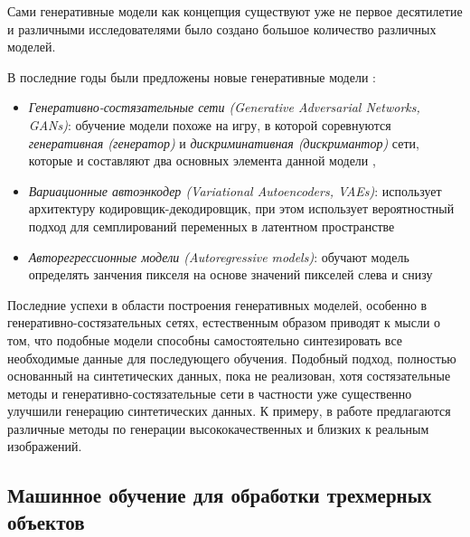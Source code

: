 Сами генеративные модели как концепция существуют уже не первое десятилетие и различными исследователями было создано большое количество различных моделей.

В последние годы были предложены новые генеративные модели \cite{sanchez-at-glance}:

\begin{itemize}

\item \textit{Генеративно-состязательные сети (Generative Adversarial Networks, GANs)}: обучение модели похоже на игру, в которой соревнуются \textit{генеративная (генератор)} и \textit{дискриминативная (дискримантор)} сети, которые и составляют два основных элемента данной модели \cite{gan-1}, \cite{gan-super}

\item \textit{Вариационные автоэнкодер (Variational Autoencoders, VAEs)}: использует архитектуру кодировщик-декодировщик, при этом использует вероятностный подход для семплирований переменных в латентном пространстве


\item \textit{Авторегрессионные модели (Autoregressive models)}: обучают модель определять занчения пикселя на основе значений пикселей слева и снизу


\end{itemize}

Последние успехи в области построения генеративных моделей, особенно в генеративно-состязательных сетях, естественным образом приводят к мысли о том, что подобные модели способны самостоятельно синтезировать все необходимые данные для последующего обучения. Подобный подход, полностью основанный на синтетических данных, пока не реализован, хотя состязательные методы и генеративно-состязательные сети в частности уже существенно улучшили генерацию синтетических данных. К примеру, в работе \cite{Shrivastava-gap-real} предлагаются различные методы по генерации высококачественных и близких к реальным изображений.

\subsection{Машинное обучение для обработки трехмерных объектов}

